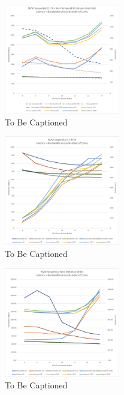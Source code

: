 \begin{figure}
    \centering
    \caption{To Be Captioned} %
    \includegraphics[width=0.45\textwidth]{charts/sequential-w10-crop.pdf}
\end{figure}




\begin{figure}
    \centering
    \caption{To Be Captioned} %
    \includegraphics[width=0.45\textwidth]{charts/sequential-w5-crop.pdf}
\end{figure}


\begin{figure}
    \centering
    \caption{To Be Captioned} %
    \includegraphics[width=0.45\textwidth]{charts/sequential-w6-crop.pdf}
\end{figure}


